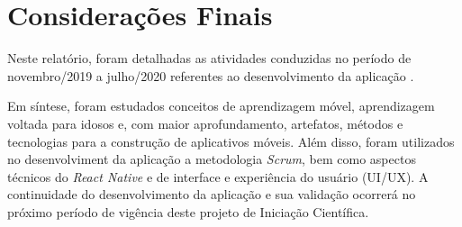 \chapter{Considerações Finais} \label{sec:conclusao}
Neste relatório, foram detalhadas as atividades conduzidas no período de novembro/2019 a julho/2020 referentes ao desenvolvimento da aplicação \crossword. 

Em síntese, foram estudados conceitos de aprendizagem móvel, aprendizagem voltada para idosos e, com maior aprofundamento, artefatos, métodos e tecnologias para a construção de aplicativos móveis. Além disso, foram utilizados no desenvolviment da aplicação \crossword a metodologia \textit{Scrum}, bem como aspectos técnicos do \textit{React Native} e de interface e experiência do usuário (UI/UX). A continuidade do desenvolvimento da aplicação e sua validação ocorrerá no próximo período de vigência deste projeto de Iniciação Científica.